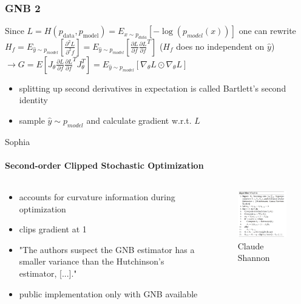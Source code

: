 \documentclass[
	11pt, %
	aspectratio=169, %
]{beamer}
\begin{document}
\begin{frame}
	\frametitle{GNB 2}
	Since $L=H(p_{\text{data}}, p_{\text{model}}) = E_{x\sim p_{data}}[-\log(p_{model}(x))]$ one can rewrite  $H_f = E_{\hat{y} \sim p_{model}}[\frac{\partial^2 L }{\partial^2 f }] =E_{\hat{y} \sim p_{model}}[\frac{\partial L }{\partial f }\frac{\partial L }{\partial f }^T] $ ($H_f$ does no independent on $\hat{y}$)\\
	$\rightarrow G = E[J_\theta \frac{\partial L }{\partial f }\frac{\partial L }{\partial f }^T J_\theta^T] = E_{\hat{y} \sim p_{model}}[\nabla_\theta L \odot \nabla_\theta L] $
	\begin{itemize}
		\item splitting up second derivatives in expectation is called Bartlett's second identity 
		\item sample $\hat{y} \sim p_{model}$ and calculate gradient w.r.t. $L$
	\end{itemize}

	
\end{frame}

\begin{frame}{Sophia}
	\framesubtitle{\textbf{S}econd-\textbf{o}rder Clip\textbf{p}ed Stoc\textbf{h}astic Opt\textbf{i}miz\textbf{a}tion}
	 \begin{columns}[c] %
		\begin{column}{0.45\textwidth} %
			\begin{itemize}
				\item accounts for curvature information during optimization
				\item clips gradient at 1
				\item "The authors suspect the GNB estimator has a smaller variance than the Hutchinson’s
				estimator, [...]."
				\item public implementation only with GNB available
			\end{itemize}
		\end{column}
		\begin{column}{0.55\textwidth} %
        	\begin{figure}
        	    \centering
                \includegraphics[width=6.5cm]{figures/sophia_algo.png}
        	    \caption*{Claude Shannon}
        	\end{figure}
		\end{column}
	\end{columns}
\end{frame}
\end{document}
